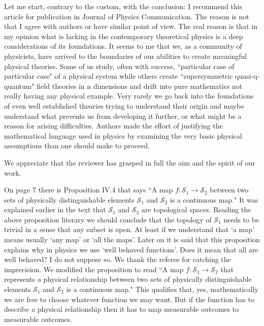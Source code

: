 \documentclass[10pt]{article}
\begin{document}
\begin{response}{Let me start, contrary to the custom, with the conclusion: I recommend this article
		for publication in Journal of Physics Communication. The reason is not that I agree with
		authors or have similar point of view. The real reason is that in my opinion what is lacking
		in the contemporary theoretical physics is a deep considerations of its foundations. It seems
		to me that we, as a community of physicists, have arrived to the boundaries of our abilities
		to create meaningful physical theories. Some of us study, often with success, ``particular
		case of particular case" of a physical system while others create ``supersymmetric quasi-q-
		quantum" field theories in n dimensions and drift into pure mathematics not really having
		any physical example. Very rarely we go back into the foundations of even well established
		theories trying to understand their origin and maybe understand what prevents us from
		developing it further, or what might be a reason for arising difficulties. Authors made the
		effort of justifying the mathematical language used in physics by examining the very basic
		physical assumptions than one should make to proceed.}

We appreciate that the reviewer has grasped in full the aim and the spirit of our work.

\end{response}
\begin{response}{On page 7 there is Proposition IV.4 that says ``A map $f : \mathcal{S}_1 \to \mathcal{S}_2$ between two sets
		of physically distinguishable elements $\mathcal{S}_1$ and $\mathcal{S}_2$ is a continuous map." It was explained
		earlier in the text that $\mathcal{S}_1$ and $\mathcal{S}_2$ are topological spaces. Reading the above proposition
		literary we should conclude that the topology of $\mathcal{S}_1$ needs to be trivial in a sense that any
		subset is open. At least if we understand that `a map' means usually `any map' or `all
		the maps'. Later on it is said that this proposition explains why in physics we use `well
		behaved functions'. Does it mean that all are well behaved? I do not suppose so.}
 We thank the referee for catching the imprecision. We modified the proposition to read ``A map $f:\mathcal{S}_1 \rightarrow \mathcal{S}_2$ that represents a physical relationship between two sets of physically distinguishable elements $\mathcal{S}_1$ and $\mathcal{S}_2$ is a continuous map." This qualifies that, yes, mathematically we are free to choose whatever function we may want. But if the function has to describe a physical relationship then it has to map measurable outcomes to measurable outcomes.
\end{response}
\end{document}

